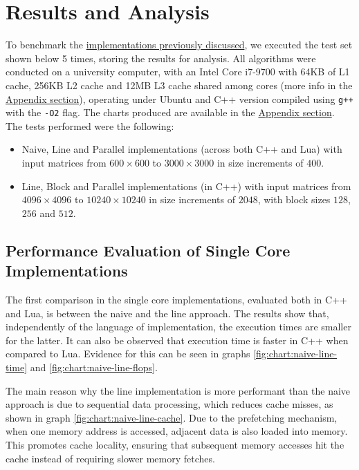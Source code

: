 \section{Results and Analysis} \label{section:results}

To benchmark the \hyperref[section:algorithms]{implementations previously discussed}, we executed the test set shown below 5 times, storing the results for analysis. All algorithms were conducted on a university computer, with an Intel Core i7-9700 with 64KB of L1 cache, 256KB L2 cache and 12MB L3 cache shared among cores (more info in the \hyperref[section:appendix:pc_specs]{Appendix section}), operating under Ubuntu and C++ version compiled using \verb|g++| with the \verb|-O2| flag. The charts produced are available in the \hyperref[section:appendix]{Appendix section}. The tests performed were the following:

\begin{itemize}
    \item Naive, Line and Parallel implementations (across both C++ and Lua) with input matrices from $600 \times 600$ to $3000 \times 3000$ in size increments of $400$.
    \item Line, Block and Parallel implementations (in C++) with input matrices from $4096 \times 4096$ to $10240 \times 10240$ in size increments of $2048$, with block sizes $128$, $256$ and $512$.
\end{itemize}

\subsection{Performance Evaluation of Single Core Implementations}

The first comparison in the single core implementations, evaluated both in C++ and Lua, is between the naive and the line approach. The results show that, independently of the language of implementation, the execution times are smaller for the latter. It can also be observed that execution time is faster in C++ when compared to Lua. Evidence for this can be seen in graphs \ref{fig:chart:naive-line-time} and \ref{fig:chart:naive-line-flops}.

The main reason why the line implementation is more performant than the naive approach is due to sequential data processing, which reduces cache misses, as shown in graph \ref{fig:chart:naive-line-cache}. Due to the prefetching mechanism, when one memory address is accessed, adjacent data is also loaded into memory. This promotes cache locality, ensuring that subsequent memory accesses hit the cache instead of requiring slower memory fetches.

